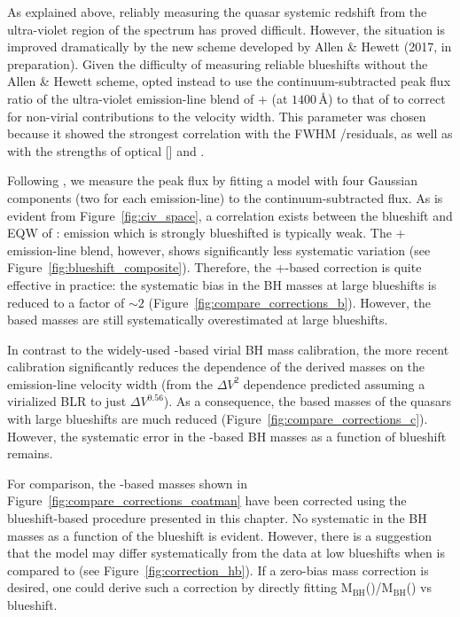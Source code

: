 As explained above, reliably measuring the quasar systemic redshift from the ultra-violet region of the spectrum has proved difficult.
However, the situation is improved dramatically by the new scheme developed by Allen \& Hewett (2017, in preparation).
Given the difficulty of measuring reliable  blueshifts without the Allen \& Hewett scheme, \citet{runnoe13} opted instead to use the continuum-subtracted peak flux ratio of the ultra-violet emission-line blend of + (at $1400$\,\AA) to that of  to correct for non-virial contributions to the  velocity width.
This parameter was chosen because it showed the strongest correlation with the FWHM /\hb residuals, as well as with the strengths of optical [] and .

Following \citet{runnoe13}, we measure the peak flux by fitting a model with four Gaussian components (two for each emission-line) to the continuum-subtracted flux.
As is evident from Figure~\ref{fig:civ_space}, a correlation exists between the blueshift and EQW of :  emission which is strongly blueshifted is typically weak.
The + emission-line blend, however, shows significantly less systematic variation (see Figure~\ref{fig:blueshift_composite}).
Therefore, the +-based correction is quite effective in practice: the systematic bias in the  BH masses at large  blueshifts is reduced to a factor of $\sim2$ (Figure~\ref{fig:compare_corrections_b}).
However, the  based masses are still systematically overestimated at large  blueshifts.

In contrast to the widely-used \citet{vestergaard06} -based virial BH mass calibration, the more recent \citet{park13} calibration significantly reduces the dependence of the derived masses on the emission-line velocity width (from the $\Delta V^2$ dependence predicted assuming a virialized BLR to just $\Delta V^{0.56}$).
As a consequence, the  based masses of the quasars with large  blueshifts are much reduced (Figure~\ref{fig:compare_corrections_c}).
However, the systematic error in the -based BH masses as a function of  blueshift remains.

For comparison, the -based masses shown in Figure~\ref{fig:compare_corrections_coatman} have been corrected using the  blueshift-based procedure presented in this chapter.
No systematic in the BH masses as a function of the  blueshift is evident.
However, there is a suggestion that the model may differ systematically from the data at low blueshifts when  is compared to \hb (see Figure~\ref{fig:correction_hb}).
If a zero-bias mass correction is desired, one could derive such a correction by directly fitting M$_{\text{BH}}$()/M$_{\text{BH}}$(\hbns) vs  blueshift.

